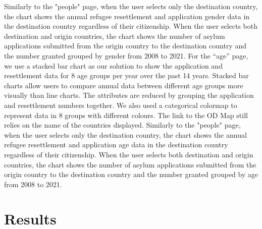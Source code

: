\documentclass[journal]{vgtc}                %
\begin{document}
 Similarly to the "people" page, when the user selects only the destination country, the chart shows the annual refugee resettlement and application gender data in the destination country regardless of their citizenship. When the user selects both destination and origin countries, the chart shows the number of asylum applications submitted from the origin country to the destination country and the number granted grouped by gender from 2008 to 2021.
 For the “age” page, we use a stacked bar chart as our solution to show the application and resettlement data for 8 age groups per year over the past 14 years. Stacked bar charts allow users to compare annual data between different age groups more visually than line charts. The attributes are reduced by grouping the application and resettlement numbers together. We also used a categorical colormap to represent data in 8 groups with different colours. The link to the OD Map still relies on the name of the countries displayed.
 Similarly to the "people" page, when the user selects only the destination country, the chart shows the annual refugee resettlement and application age data in the destination country regardless of their citizenship. When the user selects both destination and origin countries, the chart shows the number of asylum applications submitted from the origin country to the destination country and the number granted grouped by age from 2008 to 2021.
 \section{Results}
\end{document}
